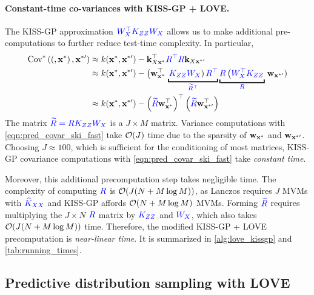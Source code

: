 \paragraph{Constant-time co-variances with KISS-GP + LOVE.}
The KISS-GP approximation $\color{blue} W_{X}^\top K_{Z Z} W_{X}$ allows us to make additional pre-computations to further reduce test-time complexity.
In particular,
%
\begin{align}
  \covtest(\bxtest, \bxtestprime)
  &\approx k(\bxtest, \bxtestprime) - \bk_{\bX \bxtest}^\top {\color{blue} \bR^\top \bR} \bk_{\bX \bxtestprime}
  \nonumber
  \\
  &\approx k(\bxtest, \bxtestprime) - \left( \bw^\top_{\bxtest} \right. \underbracket{\left. {\color{blue} \bK_{\bZ\bZ} \bW_\bX} \right) {\color{blue} \bR^\top}}_{\color{blue} \widetilde \bR^\top}
  \underbracket{{\color{blue} \bR} \left( {\color{blue} \bW_\bX^\top \bK_{\bZ\bZ}} \right.}_{\color{blue} \bR} \left. \bw_{\bxtestprime} \right)
  \nonumber
  \\
  &\approx k(\bxtest, \bxtestprime) -
  \left( {\color{blue} \widetilde \bR} \bw^\top_{\bxtest} \right)^\top
  \left( {\color{blue} \widetilde \bR} \bw^\top_{\bxtestprime} \right)
  \label{eqn:pred_covar_ski_fast}
\end{align}
%
The matrix $\color{blue} \widetilde {R} = R K_{ZZ} W_{X}$ is a $J \times M$ matrix.
Variance computations with \eqref{eqn:pred_covar_ski_fast} take $\bigo{J}$ time due to the sparsity of $\mathbf{w}_{\mathbf{x}^*}$ and $\mathbf{w}_{\mathbf{x}^{*\prime}}$.
Choosing $J \approx 100$, which is sufficient for the conditioning of most matrices, KISS-GP covariance computations with \cref{eqn:pred_covar_ski_fast} take \emph{constant time}.

Moreover, this additional precomputation step takes negligible time.
The complexity of computing $\color{blue} R$ is $\bigo{J(N + M \log M)}$, as Lanczos requires $J$ MVMs with $\color{blue} \widehat{K}_{XX}$ and KISS-GP affords $\bigo{N + M \log M}$ MVMs.
Forming $\color{blue} \widetilde {R}$ requires multiplying the $J \! \times \! N$ $\color{blue} R$ matrix by $\color{blue} K_{ZZ}$ and $\color{blue} W_{X}$, which also takes $\bigo{J(N + M \log M)}$ time.
Therefore, the modified KISS-GP + LOVE precomputation is \emph{near-linear time}.
It is summarized in \cref{alg:love_kissgp} and \cref{tab:running_times}.



\subsection{Predictive distribution sampling with LOVE{}}
\label{sec:sampling_method}

